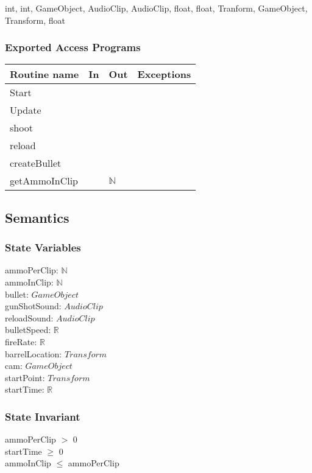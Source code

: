 \documentclass[12pt]{article}
\begin{document}
int, int, GameObject, AudioClip, AudioClip, float, float, Tranform, GameObject, Transform, float

\subsubsection* {Exported Access Programs}

\begin{tabular}{| l | l | l | l |}
	\hline
	\textbf{Routine name} & \textbf{In} & \textbf{Out} & \textbf{Exceptions}\\
	\hline
	Start & ~ & ~  & ~\\
	Update & ~ & ~  & ~\\
	shoot & ~ & ~  & ~\\
	reload & ~ & ~ & ~\\
	createBullet & ~ & ~ & ~\\
	{\color{magenta} getAmmoInClip} & ~ & {\color{magenta} $\mathbb{N}$} & ~\\
	\hline
\end{tabular}

\subsection* {Semantics}

\subsubsection* {State Variables}

ammoPerClip: $\mathbb{N}$\\
ammoInClip: $\mathbb{N}$\\
bullet: $GameObject$\\
gunShotSound: $AudioClip$\\
reloadSound: $AudioClip$\\
bulletSpeed: $\mathbb{R}$\\
fireRate: $\mathbb{R}$\\
barrelLocation: $Transform$\\
cam: $GameObject$\\
startPoint: $Transform$\\
startTime: $\mathbb{R}$\\
\subsubsection* {State Invariant}

ammoPerClip $>$ 0\\
startTime $\geq$ 0\\
ammoInClip $\leq$ ammoPerClip\\
\end{document}
